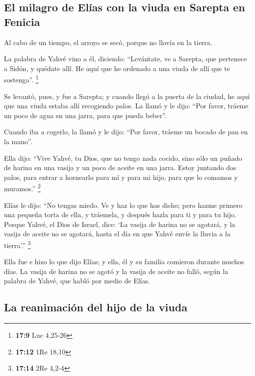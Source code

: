 \hypertarget{el-milagro-de-eluxedas-con-la-viuda-en-sarepta-en-fenicia}{%
\subsection{El milagro de Elías con la viuda en Sarepta en
Fenicia}\label{el-milagro-de-eluxedas-con-la-viuda-en-sarepta-en-fenicia}}

 Al cabo de un tiempo, el arroyo se secó, porque no llovía
en la tierra.

 La palabra de Yahvé vino a él, diciendo: 
``Levántate, ve a Sarepta, que pertenece a Sidón, y quédate allí. He
aquí que he ordenado a una viuda de allí que te sostenga''. \footnote{\textbf{17:9}
  Luc 4,25-26}

 Se levantó, pues, y fue a Sarepta; y cuando llegó a la
puerta de la ciudad, he aquí que una viuda estaba allí recogiendo palos.
La llamó y le dijo: ``Por favor, tráeme un poco de agua en una jarra,
para que pueda beber''.

 Cuando iba a cogerlo, la llamó y le dijo: ``Por favor,
tráeme un bocado de pan en la mano''.

 Ella dijo: ``Vive Yahvé, tu Dios, que no tengo nada
cocido, sino sólo un puñado de harina en una vasija y un poco de aceite
en una jarra. Estoy juntando dos palos, para entrar a hornearlo para mí
y para mi hijo, para que lo comamos y muramos.'' \footnote{\textbf{17:12}
  1Re 18,10}

 Elías le dijo: ``No tengas miedo. Ve y haz lo que has
dicho; pero hazme primero una pequeña torta de ella, y tráemela, y
después hazla para ti y para tu hijo.  Porque Yahvé, el
Dios de Israel, dice: `La vasija de harina no se agotará, y la vasija de
aceite no se agotará, hasta el día en que Yahvé envíe la lluvia a la
tierra'.'' \footnote{\textbf{17:14} 2Re 4,2-4}

 Ella fue e hizo lo que dijo Elías; y ella, él y su
familia comieron durante muchos días.  La vasija de
harina no se agotó y la vasija de aceite no falló, según la palabra de
Yahvé, que habló por medio de Elías.

\hypertarget{la-reanimaciuxf3n-del-hijo-de-la-viuda}{%
\subsection{La reanimación del hijo de la
viuda}\label{la-reanimaciuxf3n-del-hijo-de-la-viuda}}

